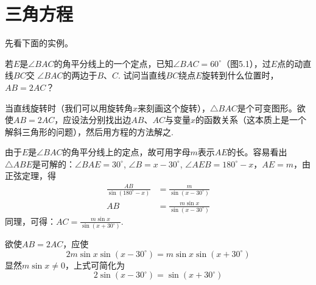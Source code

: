 \chapter{三角方程}
先看下面的实例。

若$E$是$\angle BAC$的角平分线上的一个定点，已知$\angle BAC=60^{\circ}$（图5.1），过$E$点的动直线$BC$交
$\angle BAC$的两边于$B$、$C$. 试问当直线$BC$绕点$E$旋转到什么位置时，$AB=2AC$？

\noindent
\begin{minipage}{.45\textwidth}
\begin{analyze}
当直线旋转时（我们可以用旋转角$x$来刻画这个旋转），$\triangle BAC$是个可变图形。欲使$AB=2AC$，应设法分别找出边$AB$、$AC$与变量$x$的函数关系（这本质上是一个解斜三角形的问题），然后用方程的方法解之.
\end{analyze}
\end{minipage}
\hfill
\begin{minipage}{.45\textwidth}
\centering
{}
\end{minipage}

\begin{solution}
由于$E$是$\angle BAC$的角平分线上的定点，故可用字母$m$表示$AE$的长。容易看出$\triangle ABE$是可解的：$\angle BAE=30^{\circ}$, $\angle B=x-30^{\circ}$, $\angle AEB=180^{\circ}-x$，$AE=m$，由正弦定理，得
\[\begin{split}
    \frac{AB}{\sin(180^{\circ}-x)}&=\frac{m}{\sin(x-30^{\circ})}\\
    AB&=\frac{m\sin x}{\sin (x-30^{\circ})}
\end{split}\]
同理，可得：$AC=\frac{m\sin x}{\sin(x+30^{\circ})}$.

欲使$AB=2AC$，应使
\[2m\sin x\sin (x-30^{\circ})=m\sin x\sin(x+30^{\circ})\]
显然$m\sin x\ne 0$，上式可简化为
\[2\sin (x-30^{\circ})=\sin(x+30^{\circ})\]
\end{solution}

